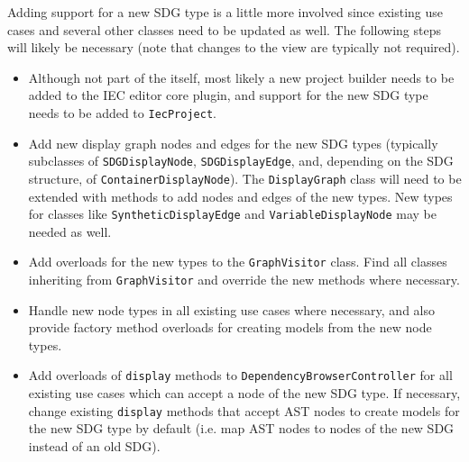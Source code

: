 Adding support for a new SDG type is a little more involved since existing use cases and several other classes need to 
be updated as well. The following steps will likely be necessary (note that changes to the view are typically not 
required).
\begin{itemize}
  \item Although not part of the \SB itself, most likely a new project builder needs to be added to the IEC editor core 
  plugin, and support for the new SDG type needs to be added to \lstinline|IecProject|.
  
  \item Add new display graph nodes and edges for the new SDG types (typically subclasses of 
  \lstinline|SDGDisplayNode|, \lstinline|SDGDisplayEdge|, and, depending on the SDG structure, of
  \lstinline|ContainerDisplayNode|). The \lstinline|DisplayGraph| class will need to be extended with methods to add 
  nodes and edges of the new types. New types for classes like \lstinline|SyntheticDisplayEdge| and 
  \lstinline|VariableDisplayNode| may be needed as well.
  
  \item Add overloads for the new types to the \lstinline|GraphVisitor| class. Find all classes inheriting from 
  \lstinline|GraphVisitor| and override the new methods where necessary.
  
  \item Handle new node types in all existing use cases where necessary, and also provide factory method overloads for 
  creating models from the new node types.
  
  \item Add overloads of \lstinline|display| methods to \lstinline|DependencyBrowserController| for all existing use 
  cases which can accept a node of the new SDG type. If necessary, change existing \lstinline|display| methods that 
  accept AST nodes to create models for the new SDG type by default (i.e. map AST nodes to nodes of the new SDG instead 
  of an old SDG).
\end{itemize}